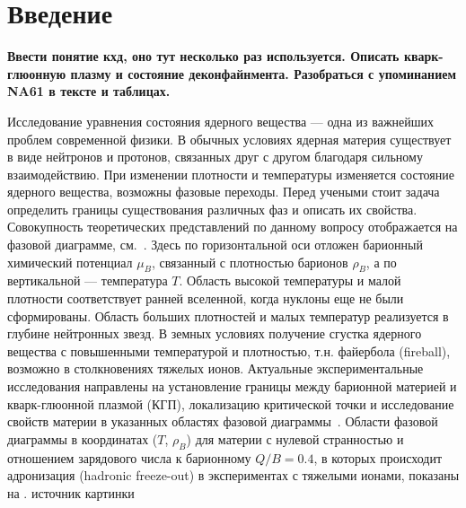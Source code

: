 \chapter*{Введение}\label{sec:secIntro}

\todo
\textbf{Ввести понятие кхд, оно тут несколько раз используется. Описать кварк-глюонную плазму и состояние деконфайнмента. Разобраться с упоминанием NA61 в тексте и таблицах.}


Исследование уравнения состояния ядерного вещества --- одна из важнейших проблем современной физики. В обычных условиях ядерная материя существует в виде нейтронов и протонов, связанных друг с другом благодаря сильному взаимодействию. При изменении плотности и температуры изменяется состояние ядерного вещества, возможны фазовые переходы. Перед учеными стоит задача определить границы существования различных фаз и описать их свойства. Совокупность теоретических представлений по данному вопросу отображается на фазовой диаграмме, см.~. Здесь по горизонтальной оси отложен барионный химический потенциал $\mu_{B}$, связанный с плотностью барионов $\rho_{B}$, а по вертикальной --- температура $T$. Область высокой температуры и малой плотности соответствует ранней вселенной, когда нуклоны еще не были сформированы. Область больших плотностей и малых температур реализуется в глубине нейтронных звезд. В земных условиях получение сгустка ядерного вещества с повышенными температурой и плотностью, т.н. файербола (fireball), возможно в столкновениях тяжелых ионов. Актуальные экспериментальные исследования направлены на установление границы между барионной материей и кварк-глюонной плазмой (КГП), локализацию критической точки и исследование свойств материи в указанных областях фазовой диаграммы~\cite{CBMBook}. Области фазовой диаграммы в координатах ($T$, $\rho_{B}$) для материи с нулевой странностью и отношением зарядового числа к барионному $Q/B=0.4$, в которых происходит адронизация (hadronic freeze-out) в экспериментах с тяжелыми ионами, показаны на . \cite{} \todo источник картинки

